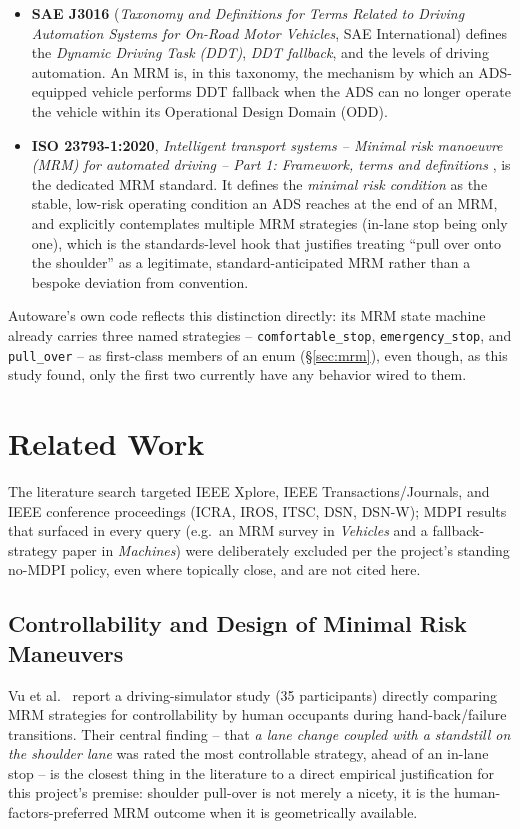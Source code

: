 \documentclass[11pt]{article}
\newcommand{\code}[1]{\texttt{#1}}
\begin{document}
\begin{itemize}[leftmargin=1.4em]
  \item \textbf{SAE J3016} (\emph{Taxonomy and Definitions for Terms Related to Driving Automation
  Systems for On-Road Motor Vehicles}, SAE International) defines the \emph{Dynamic Driving Task
  (DDT)}, \emph{DDT fallback}, and the levels of driving automation. An MRM is, in this taxonomy,
  the mechanism by which an ADS-equipped vehicle performs DDT fallback when the ADS can no longer
  operate the vehicle within its Operational Design Domain (ODD).
  \item \textbf{ISO 23793-1:2020}, \emph{Intelligent transport systems -- Minimal risk manoeuvre
  (MRM) for automated driving -- Part 1: Framework, terms and definitions}
  \cite{iso23793}, is the dedicated MRM standard. It defines the \emph{minimal risk condition} as
  the stable, low-risk operating condition an ADS reaches at the end of an MRM, and explicitly
  contemplates multiple MRM strategies (in-lane stop being only one), which is the standards-level
  hook that justifies treating ``pull over onto the shoulder'' as a legitimate, standard-anticipated
  MRM rather than a bespoke deviation from convention.
\end{itemize}

Autoware's own code reflects this distinction directly: its MRM state machine already carries
three named strategies -- \code{comfortable\_stop}, \code{emergency\_stop}, and \code{pull\_over}
-- as first-class members of an enum (\S\ref{sec:mrm}), even though, as this study found, only the
first two currently have any behavior wired to them.

\section{Related Work}
\label{sec:relatedwork}

The literature search targeted IEEE Xplore, IEEE Transactions/Journals, and IEEE conference
proceedings (ICRA, IROS, ITSC, DSN, DSN-W); MDPI results that surfaced in every query (e.g.\ an MRM
survey in \emph{Vehicles} and a fallback-strategy paper in \emph{Machines}) were deliberately
excluded per the project's standing no-MDPI policy, even where topically close, and are not cited
here.

\subsection{Controllability and Design of Minimal Risk Maneuvers}
Vu et al.\ \cite{vu2023mrm} report a driving-simulator study (35 participants) directly comparing
MRM strategies for controllability by human occupants during hand-back/failure transitions. Their
central finding -- that \emph{a lane change coupled with a standstill on the shoulder lane} was
rated the most controllable strategy, ahead of an in-lane stop -- is the closest thing in the
literature to a direct empirical justification for this project's premise: shoulder pull-over is
not merely a nicety, it is the human-factors-preferred MRM outcome when it is geometrically
available.
\end{document}

